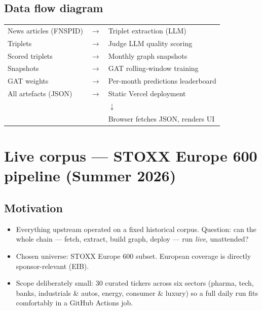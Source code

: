 \documentclass[11pt]{article}
\begin{document}
\subsection{Data flow diagram}
\begin{center}
\begin{tabular}{lcl}
News articles (FNSPID)      & \(\to\) & Triplet extraction (LLM) \\
Triplets                    & \(\to\) & Judge LLM quality scoring \\
Scored triplets             & \(\to\) & Monthly graph snapshots \\
Snapshots                   & \(\to\) & GAT rolling-window training \\
GAT weights                 & \(\to\) & Per-month predictions leaderboard \\
All artefacts (JSON)        & \(\to\) & Static Vercel deployment \\
                            &         & \(\downarrow\) \\
                            &         & Browser fetches JSON, renders UI \\
\end{tabular}
\end{center}

\section{Live corpus --- STOXX Europe 600 pipeline (Summer 2026)}
\label{sec:stoxx}

\subsection{Motivation}
\begin{itemize}
  \item Everything upstream operated on a fixed historical corpus. Question: can the whole chain --- fetch, extract, build graph, deploy --- run \emph{live}, unattended?
  \item Chosen universe: STOXX Europe 600 subset. European coverage is directly sponsor-relevant (EIB).
  \item Scope deliberately small: 30 curated tickers across six sectors (pharma, tech, banks, industrials \& autos, energy, consumer \& luxury) so a full daily run fits comfortably in a GitHub Actions job.
\end{itemize}
\end{document}
